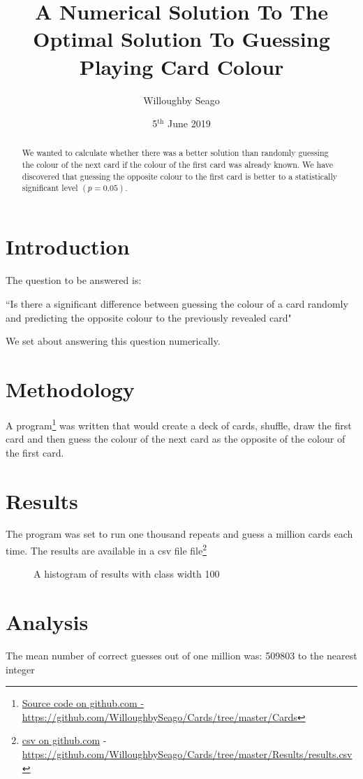 \documentclass{article}
\date{5\(^\text{th}\) June 2019}
\author{Willoughby Seago}
\title{A Numerical Solution To The Optimal Solution To Guessing Playing Card Colour}
\begin{document}
	\maketitle
	\begin{abstract}
		We wanted to calculate whether there was a better solution than randomly guessing the colour of the next card if the colour of the first card was already known.
        We have discovered that guessing the opposite colour to the first card is better to a statistically significant level \((p=0.05)\).
	\end{abstract}
    \hspace{2em}
    \tableofcontents
    \newpage
    \section*{Introduction}
    The question to be answered is:
    
    ``Is there a significant difference between guessing the colour of a card randomly and predicting the opposite colour to the previously revealed card"
    
    We set about answering this question numerically.
    \section{Methodology}
    A program\footnote{\href{https://github.com/WilloughbySeago/Cards/tree/master/Cards}{Source code on github.com - }\url{https://github.com/WilloughbySeago/Cards/tree/master/Cards}} was written that would create a deck of cards, shuffle, draw the first card and then guess the colour of the next card as the opposite of the colour of the first card.
    \section{Results}
    The program was set to run one thousand repeats and guess a million cards each time.
    The results are available in a csv file file\footnote{\href{https://github.com/WilloughbySeago/Cards/tree/master/Results/results.csv}{csv on github.com} - \url{https://github.com/WilloughbySeago/Cards/tree/master/Results/results.csv}}
    
    \begin{figure}[h]
        \centering
        \scalebox{.4}{}
        \caption{A histogram of results with class width 100}
    \end{figure}
    \section{Analysis}
    The mean number of correct guesses out of one million was: 509803 to the nearest integer
    
\end{document}
